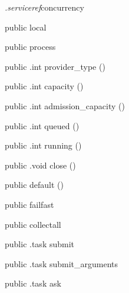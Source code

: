 \begin{CrexxClass}{\textit{.serviceref}}{concurrency}

  \begin{Hierarchy}
  \end{Hierarchy}

  \begin{Members}

    \Factory
      {public}
      {local}
      {}

    \Factory
      {public}
      {process}
      {}

    \Method
      {public}
      {.int}
      {provider\_type}
      {()}

    \Method
      {public}
      {.int}
      {capacity}
      {()}

    \Method
      {public}
      {.int}
      {admission\_capacity}
      {()}

    \Method
      {public}
      {.int}
      {queued}
      {()}

    \Method
      {public}
      {.int}
      {running}
      {()}

    \Method
      {public}
      {.void}
      {close}
      {()}

    \Factory
      {public}
      {default}
      {()}

    \Factory
      {public}
      {failfast}
      {}

    \Factory
      {public}
      {collectall}
      {}

    \Method
      {public}
      {.task}
      {submit}
      {}

    \Method
      {public}
      {.task}
      {submit\_arguments}
      {}

    \Method
      {public}
      {.task}
      {ask}
      {}


\end{Members}
\end{CrexxClass}
